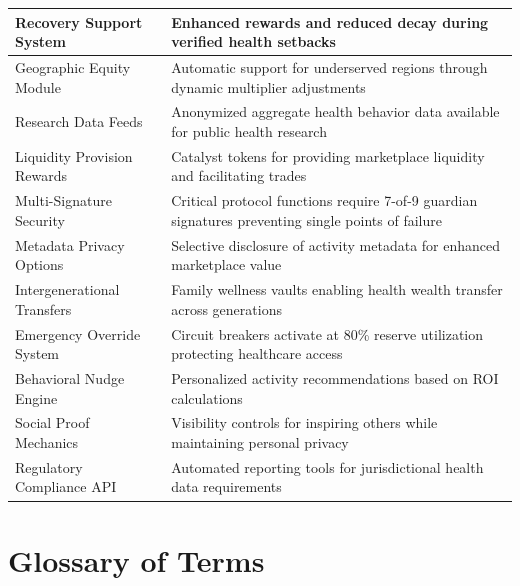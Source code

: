 \documentclass[11pt,letterpaper]{article}
\begin{document}
\begin{longtable}{p{5cm}p{9.5cm}}
Recovery Support System & Enhanced rewards and reduced decay during verified health setbacks \\
\midrule
Geographic Equity Module & Automatic support for underserved regions through dynamic multiplier adjustments \\
\midrule
Research Data Feeds & Anonymized aggregate health behavior data available for public health research \\
\midrule
Liquidity Provision Rewards & Catalyst tokens for providing marketplace liquidity and facilitating trades \\
\midrule
Multi-Signature Security & Critical protocol functions require 7-of-9 guardian signatures preventing single points of failure \\
\midrule
Metadata Privacy Options & Selective disclosure of activity metadata for enhanced marketplace value \\
\midrule
Intergenerational Transfers & Family wellness vaults enabling health wealth transfer across generations \\
\midrule
Emergency Override System & Circuit breakers activate at 80\% reserve utilization protecting healthcare access \\
\midrule
Behavioral Nudge Engine & Personalized activity recommendations based on ROI calculations \\
\midrule
Social Proof Mechanics & Visibility controls for inspiring others while maintaining personal privacy \\
\midrule
Regulatory Compliance API & Automated reporting tools for jurisdictional health data requirements \\
\bottomrule
\end{longtable}

\section{Glossary of Terms}
\end{document}
